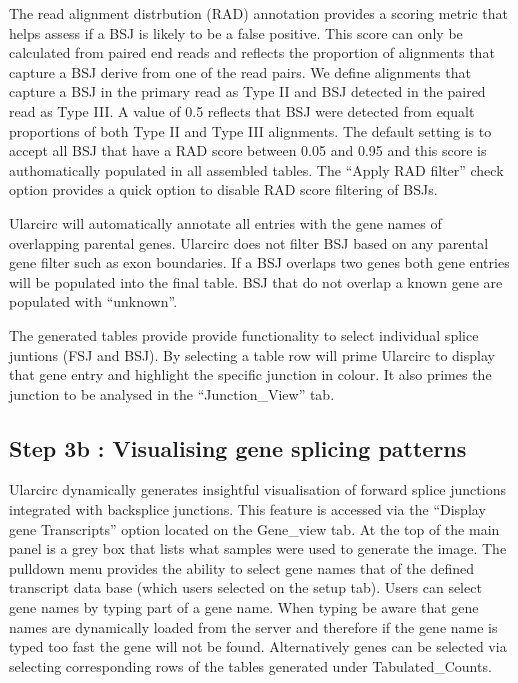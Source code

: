 \documentclass[12pt]{article}\usepackage[]{graphicx}\usepackage[]{color}
\begin{document}
The read alignment distrbution (RAD) annotation provides a scoring metric that helps assess if a BSJ is likely to be a false positive. This score can only be calculated from paired end reads and reflects the proportion of alignments that capture a BSJ derive from one of the read pairs. We define alignments that capture a BSJ in the primary read as Type II and BSJ detected in the paired read as Type III. A value of 0.5 reflects that BSJ were detected from equalt proportions of both Type II and Type III alignments. The default setting is to accept all BSJ that have a RAD score between 0.05 and 0.95 and this score is authomatically populated in all assembled tables. The ``Apply RAD filter'' check option provides a quick option to disable RAD score filtering of BSJs.  \par

Ularcirc will automatically annotate all entries with the gene names of overlapping parental genes. Ularcirc does not filter BSJ based on any parental gene filter such as exon boundaries. If a BSJ overlaps two genes both gene entries will be populated into the final table. BSJ that do not overlap a known gene are populated with ``unknown''. \par

The generated tables provide provide functionality to select individual splice juntions (FSJ and BSJ). By selecting a table row will prime Ularcirc to display that gene entry and highlight the specific junction in colour. It also primes the junction to be analysed in the ``Junction\_View'' tab.


\subsection{Step 3b : Visualising gene splicing patterns} \label{sec:Step3b}
Ularcirc dynamically generates insightful visualisation of forward splice junctions integrated with backsplice junctions. This feature is accessed via the ``Display gene Transcripts'' option located on the Gene\_view tab. At the top of the main panel is a grey box that lists what samples were used to generate the image. The pulldown menu provides the ability to select gene names that of the defined transcript data base (which users selected on the setup tab). Users can select gene names by typing part of a gene name. When typing  be aware that gene names are dynamically loaded from the server and therefore if the gene name is typed too fast the gene will not be found.  Alternatively genes can be selected via selecting corresponding rows of the tables generated under Tabulated\_Counts. \par
\end{document}
